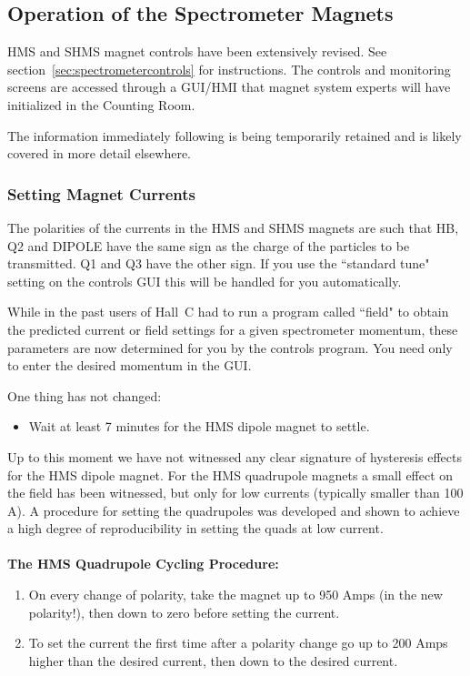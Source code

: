 {\subsection{Operation of the Spectrometer Magnets}
\label{ssec:operatemagnets}

HMS and SHMS magnet controls have been extensively revised. See
section~\ref{sec:spectrometercontrols}
for instructions. The controls and
monitoring screens are accessed through a GUI/HMI that magnet system 
experts will have initialized in the Counting Room. 

The information immediately following is being temporarily retained and is likely
covered in more detail elsewhere.

\subsubsection{Setting Magnet Currents}

The polarities of the currents in the HMS and SHMS magnets are such that
HB, Q2 and DIPOLE have the same sign as the charge of the particles
to be transmitted. Q1 and Q3 have the other sign. If you use the ``standard
tune" setting on the controls GUI this will be handled for you automatically.

While in the past users of Hall~C had to run a program called ``field" to obtain
the predicted current or field settings for a given spectrometer momentum,
these parameters are now determined for you by the controls program. You
need only to enter the desired momentum in the GUI.

One thing has not changed:
\begin{itemize}
\item{Wait at least 7 minutes for the HMS dipole magnet to settle.}
\end{itemize}

Up to this moment we have not witnessed any clear signature of hysteresis
effects for the HMS dipole magnet. For the HMS quadrupole magnets a small effect
on the field has been witnessed, but only for low currents (typically smaller
than 100 A). A procedure for setting the quadrupoles was developed
and shown to achieve a high
degree of reproducibility in setting the quads at low current.  
\\
\\
\textbf{The HMS Quadrupole Cycling Procedure:} 
\begin{enumerate}
  \item{On every change of polarity, take the magnet up to 950 Amps 
     (in the new polarity!), then down to zero before setting the
     current.} 
  \item{To set the current the first time after a polarity change 
     go up to 200 Amps higher than the desired current, 
     then down to the desired current.

}
\end{enumerate}}
